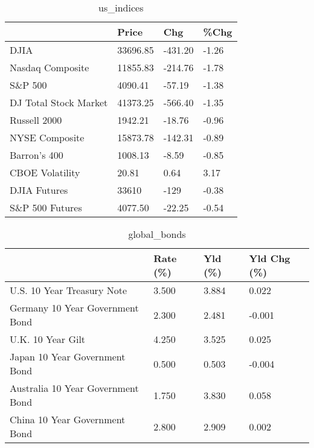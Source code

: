 \documentclass{article}%
\begin{document}
%


\begin{table}[htbp]%
\caption{us\_indices}%
\centering%
\begin{adjustbox}{width=1\textwidth}%
\begin{tabular}{llll}
\toprule
                      &    Price &     Chg &  \%Chg \\
\midrule
                 DJIA & 33696.85 & -431.20 & -1.26 \\
     Nasdaq Composite & 11855.83 & -214.76 & -1.78 \\
              S\&P 500 &  4090.41 &  -57.19 & -1.38 \\
DJ Total Stock Market & 41373.25 & -566.40 & -1.35 \\
         Russell 2000 &  1942.21 &  -18.76 & -0.96 \\
       NYSE Composite & 15873.78 & -142.31 & -0.89 \\
         Barron's 400 &  1008.13 &   -8.59 & -0.85 \\
      CBOE Volatility &    20.81 &    0.64 &  3.17 \\
         DJIA Futures &    33610 &    -129 & -0.38 \\
      S\&P 500 Futures &  4077.50 &  -22.25 & -0.54 \\
\bottomrule
\end{tabular}
%
\end{adjustbox}%
\end{table}

%


\begin{table}[htbp]%
\caption{global\_bonds}%
\centering%
\begin{adjustbox}{width=1\textwidth}%
\begin{tabular}{llll}
\toprule
                                  & Rate (\%) & Yld (\%) & Yld Chg (\%) \\
\midrule
       U.S. 10 Year Treasury Note &    3.500 &   3.884 &       0.022 \\
  Germany 10 Year Government Bond &    2.300 &   2.481 &      -0.001 \\
                U.K. 10 Year Gilt &    4.250 &   3.525 &       0.025 \\
    Japan 10 Year Government Bond &    0.500 &   0.503 &      -0.004 \\
Australia 10 Year Government Bond &    1.750 &   3.830 &       0.058 \\
    China 10 Year Government Bond &    2.800 &   2.909 &       0.002 \\
\bottomrule
\end{tabular}
%
\end{adjustbox}%
\end{table}
\end{document}
